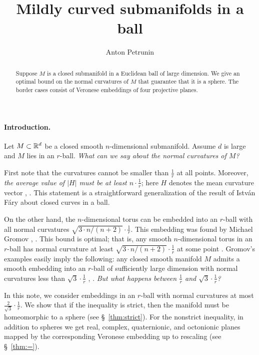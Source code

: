 \documentclass[a4paper,10pt]{article}
\def\thetitle{Mildly curved submanifolds in a ball}
\def\theauthors{Anton Petrunin}
\begin{document}


\title{\thetitle}
\author{\theauthors}
\date{}
\maketitle

\begin{abstract}
Suppose $M$ is a closed submanifold in a Euclidean ball of large dimension.
We give an optimal bound on the normal curvatures of $M$ that guarantee that it is a sphere.
The border cases consist of Veronese embeddings of four projective planes.
\end{abstract}

\paragraph{Introduction.} Let $M\subset \mathbb{R}^d$ be a closed smooth $n$-dimensional submanifold.
Assume $d$ is large and $M$ lies in an $r$-ball.
\textit{What can we say about the normal curvatures of $M$?}

First note that the curvatures cannot be smaller than $\tfrac1r$ at all points.
Moreover, 
\textit{the average value of $|H|$ must be at least $n\cdot\tfrac1r$};
here $H$ denotes the mean curvature vector \cite[28.2.5]{burago-zalgaller}, \cite[3.1]{petrunin2024a}.
This statement is a straightforward generalization of the result of István Fáry \cite{fary,tabachnikov} about closed curves in a ball.

On the other hand, the $n$-dimensional torus can be embedded into an $r$-ball with all normal curvatures $\sqrt{3\cdot n/(n+2)}\cdot\tfrac1r$.
This embedding was found by Michael Gromov
\cite[2.A]{gromov3}, \cite[1.1.A]{gromov2}.
This bound is optimal; that is, any smooth $n$-dimensional torus in an $r$-ball has normal curvature at least $\sqrt{3\cdot n/(n+2)}\cdot\tfrac1r$ at some point
\cite{petrunin2024a}.
Gromov's examples easily imply the following:
any closed smooth manifold $M$ admits a smooth embedding into an $r$-ball of sufficiently large dimension with normal curvatures less than $\sqrt{3}\cdot\tfrac1r$
\cite[1.D]{gromov3}, \cite[1.1.C]{gromov2}.
\textit{But what happens between $\tfrac1r$ and  $\sqrt{3}\cdot\tfrac1r$?}

In this note, we consider embeddings in an $r$-ball with normal curvatures at most $\tfrac2{\sqrt{3}}\cdot \tfrac1r$.
We show that if the inequality is strict, then the manifold must be homeomorphic to a sphere (see §~\ref{thm:strict}).
For the nonstrict inequality, in addition to spheres we get real, complex, quaternionic, and octonionic planes mapped by the corresponding Veronese embedding up to rescaling (see §~\ref{thm:=}).
\end{document}
